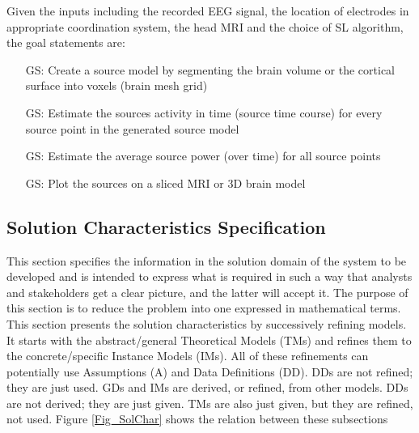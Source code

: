 \documentclass[12pt]{article}
\newcounter{goalnum} %
\begin{document}
\noindent Given the inputs including the recorded EEG signal, the location of electrodes in appropriate coordination system, the head MRI and the choice of SL algorithm, the goal statements are:

\begin{itemize}

\item[GS\refstepcounter{goalnum}\thegoalnum \label{G_meaningfulLabel}:] Create a source model by segmenting the brain volume or the cortical surface into voxels (brain mesh grid)\item[GS\refstepcounter{goalnum}\thegoalnum \label{G_meaningfulLabel}:] Estimate the sources activity in time (source time course) for every source point in the generated source model
\item[GS\refstepcounter{goalnum}\thegoalnum \label{G_meaningfulLabel}:] Estimate the average source power (over time) for all source points
\item[GS\refstepcounter{goalnum}\thegoalnum \label{G_meaningfulLabel}:] Plot the sources on a sliced MRI or 3D brain model 


%    
    

\end{itemize}

\subsection{Solution Characteristics Specification}
This section specifies the information in the solution domain of the system
to be developed and is intended to express what is required in
such a way that analysts and stakeholders get a clear picture, and the
latter will accept it. The purpose of this section is to reduce the problem into one expressed in mathematical terms.\\

This section presents the solution characteristics by successively refining
models. It starts with the abstract/general Theoretical Models (TMs) and
refines them to the concrete/specific Instance Models (IMs). All of these
refinements can potentially use Assumptions (A) and Data Definitions (DD). DDs are not refined; they are just used. GDs and IMs are derived, or refined, from other
models. DDs are not derived; they are just given. TMs are also just given, but
they are refined, not used.  Figure \ref{Fig_SolChar} shows the relation between these subsections\\
\end{document}
